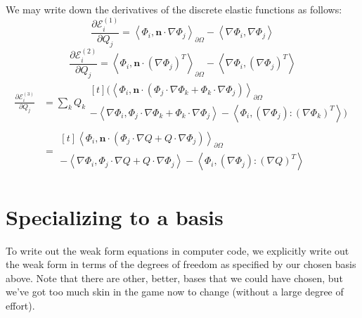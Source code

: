 \documentclass[reqno]{article}
\begin{document}
We may write down the derivatives of the discrete elastic functions as follows:
\begin{equation}
    \frac{\partial \mathcal{E}^{(1)}_i}{\partial Q_j}
    =
    \left< \Phi_i, \mathbf{n} \cdot \nabla \Phi_j \right>_{\partial \Omega}
    - \left< \nabla \Phi_i, \nabla \Phi_j \right>
\end{equation}
\begin{equation}
    \frac{\partial \mathcal{E}^{(2)}_i}{\partial Q_j}
    =
    \left< \Phi_i, \mathbf{n} \cdot \left( \nabla \Phi_j \right)^T \right>_{\partial \Omega}
    - \left< \nabla \Phi_i, \left( \nabla \Phi_j \right)^T \right>
\end{equation}
\begin{equation}
    \begin{split}
    \frac{\partial \mathcal{E}^{(3)}_i}{\partial Q_j}
        &=
        \sum_k Q_k
            \begin{multlined}[t]
            \biggl(
            \left< \Phi_i, \mathbf{n} \cdot \left( \Phi_j \cdot \nabla \Phi_k + \Phi_k \cdot \nabla \Phi_j \right) \right>_{\partial \Omega} \\
            - \left< \nabla \Phi_i, \Phi_j \cdot \nabla \Phi_k + \Phi_k \cdot \nabla \Phi_j \right>
            - \left< \Phi_i, \left( \nabla \Phi_j \right) : \left( \nabla \Phi_k \right)^T \right>
            \biggr)
            \end{multlined}\\
        &= 
        \begin{multlined}[t]
            \left< \Phi_i, \mathbf{n} \cdot \left( \Phi_j \cdot \nabla Q + Q \cdot \nabla \Phi_j \right) \right>_{\partial \Omega} \\
        - \left< \nabla \Phi_i, \Phi_j \cdot \nabla Q + Q \cdot \nabla \Phi_j \right>
        - \left< \Phi_i, \left( \nabla \Phi_j \right) : \left( \nabla Q \right)^T \right>
        \end{multlined}
    \end{split}
\end{equation}

\section{Specializing to a basis}
To write out the weak form equations in computer code, we explicitly write out the weak form in terms of the degrees of freedom as specified by our chosen basis above.
Note that there are other, better, bases that we could have chosen, but we've got too much skin in the game now to change (without a large degree of effort).
\end{document}
